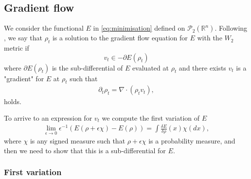 \documentclass[a4paper]{article}
\def\real{\mathbb{R}}
\begin{document}
\subsection{Gradient flow} 

We consider the functional $E$ in \eqref{eq:minimisation} defined on $\mathcal{P}_2(\real^n)$. 
Following \citet[Definition 11.1.1]{ambrosio2008gradient}, we say that $\rho_t$ is a solution to the gradient flow equation for $E$ with the $W_2$ metric if
\begin{equation*}
v_t \in -\partial E(\rho_t)
\end{equation*}
where $\partial E(\rho_t)$ is the sub-differential of $E$ evaluated at $\rho_t$ and there exists $v_t$ is a "gradient" for $E$ at $\rho_t$ such that
\begin{align*}
\partial_{t}\rho_{t}=\nabla\cdot\left(\rho_{t}v_t\right),
\end{align*} 
holds.

To arrive to an expression for $v_t$ we compute the first variation of $E$
\begin{align*}
\lim_{\epsilon\rightarrow0}\epsilon^{-1}\left(E(\rho+\epsilon\chi)-E(\rho)\right)=\int\frac{\delta E}{\delta\rho}\left(x\right)\chi\left(dx\right),
\end{align*}
where $\chi$ is any signed measure such that $\rho+\epsilon\chi$ is a probability measure, and then we need to show that this is a sub-differential for $E$.

\subsubsection{First variation}
\end{document}
